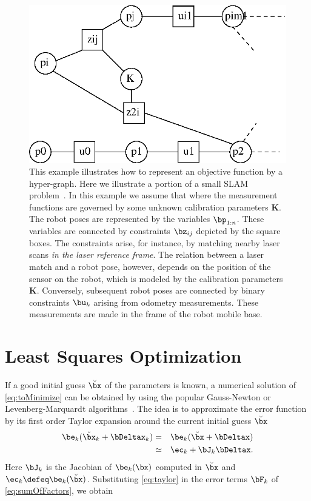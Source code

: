 \documentclass[a4paper]{article}
\begin{document}
\begin{figure}
\centering
{}
\includegraphics{pics/hgraph.eps}
\caption{This example illustrates how to represent an objective
  function by a hyper-graph. Here we illustrate a portion of a small
  SLAM problem~\cite{konolige10iros}. In this example we assume that
  where the measurement functions are governed by some unknown
  calibration parameters $\mathbf{K}$. The robot poses are represented
  by the variables $\bp_{1:n}$. These variables are connected by
  constraints $\bz_{ij}$ depicted by the square boxes. The constraints
  arise, for instance, by matching nearby laser scans \emph{in the
    laser reference frame}. The relation between a laser match and a
  robot pose, however, depends on the position of the sensor on the
  robot, which is modeled by the calibration parameters
  $\mathbf{K}$. Conversely, subsequent robot poses are connected by
  binary constraints $\bu_{k}$ arising from odometry
  measurements. These measurements are made in the frame of the robot
  mobile base.}
\label{fig:graph-example}
\end{figure}

\section{Least Squares Optimization}
If a good initial guess $\breve{\bx}$ of the parameters is known, a
numerical solution of \eqref{eq:toMinimize} can be obtained by using
the popular Gauss-Newton or Levenberg-Marquardt
algorithms~\cite[\S15.5]{Press92Book}.  The idea is to approximate the
error function by its first order Taylor expansion around the current
initial guess $\breve{\bx}$
\begin{eqnarray}
\be_{k}(\breve{\bx}_k + \bDeltax_k) &=& \be_{k}(\breve{\bx} + \bDeltax)\\
&\simeq& \ec_{k} + \bJ_{k} \bDeltax.
\label{eq:taylor}
\end{eqnarray}
Here $\bJ_{k}$ is the Jacobian of $\be_{k}(\bx)$ computed in
$\breve{\bx}$ and $\ec_{k} \defeq \be_{k}(\breve{\bx})$.
Substituting \eqref{eq:taylor} in the error terms $\bF_{k}$ of
\eqref{eq:sumOfFactors}, we obtain
\end{document}

